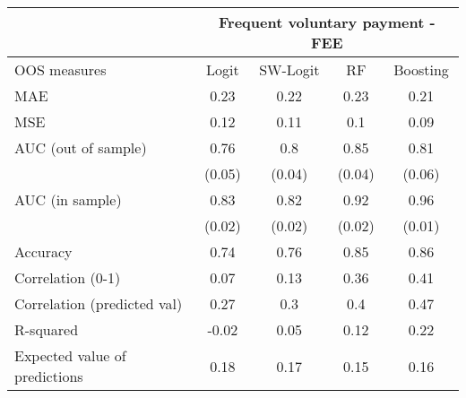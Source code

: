 \begin{tabular}{lcccc}
\toprule
      & \multicolumn{4}{c}{Frequent voluntary payment - FEE} \\
\midrule
\midrule
OOS measures & Logit & SW-Logit & RF    & Boosting \\
\midrule
\midrule
MAE   & 0.23  & 0.22  & 0.23  & 0.21 \\
MSE   & 0.12  & 0.11  & 0.1   & 0.09 \\
AUC (out of sample) & 0.76  & 0.8   & 0.85  & 0.81 \\
      & (0.05) & (0.04) & (0.04) & (0.06) \\
AUC (in sample) & 0.83  & 0.82  & 0.92  & 0.96 \\
      & (0.02) & (0.02) & (0.02) & (0.01) \\
Accuracy & 0.74  & 0.76  & 0.85  & 0.86 \\
Correlation (0-1) & 0.07  & 0.13  & 0.36  & 0.41 \\
Correlation (predicted val) & 0.27  & 0.3   & 0.4   & 0.47 \\
R-squared  & -0.02 & 0.05  & 0.12  & 0.22 \\
Expected value of predictions & 0.18  & 0.17  & 0.15  & 0.16 \\
\bottomrule
\bottomrule
\end{tabular}%
